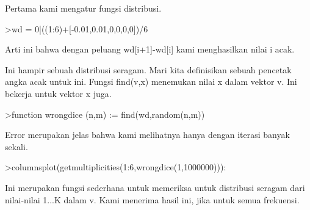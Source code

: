 \documentclass[a4paper,10pt]{article}
\begin{document}
\begin{eulernotebook}
\begin{eulercomment}
Pertama kami mengatur fungsi distribusi.
\end{eulercomment}
\begin{eulerprompt}
>wd = 0|((1:6)+[-0.01,0.01,0,0,0,0])/6
\end{eulerprompt}
\begin{euleroutput}
  [0,  0.165,  0.335,  0.5,  0.666667,  0.833333,  1]
\end{euleroutput}
\begin{eulercomment}
Arti ini bahwa dengan peluang wd[i+1]-wd[i] kami menghasilkan nilai i acak.

Ini hampir sebuah distribusi seragam. Mari kita definisikan sebuah pencetak angka acak
untuk ini. Fungsi find(v,x) menemukan nilai x dalam vektor v. Ini bekerja untuk vektor x
juga.
\end{eulercomment}
\begin{eulerprompt}
>function wrongdice (n,m) := find(wd,random(n,m))
\end{eulerprompt}
\begin{eulercomment}
Error merupakan jelas bahwa kami melihatnya hanya dengan iterasi banyak sekali.
\end{eulercomment}
\begin{eulerprompt}
>columnsplot(getmultiplicities(1:6,wrongdice(1,1000000))):
\end{eulerprompt}
\begin{eulercomment}
Ini merupakan fungsi sederhana untuk memeriksa untuk distribusi seragam dari nilai-nilai
1...K dalam v. Kami menerima hasil ini, jika untuk semua frekuensi.


\end{eulercomment}
\end{eulernotebook}
\end{document}
